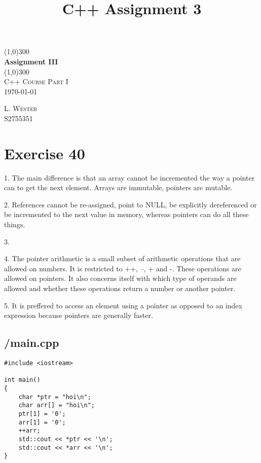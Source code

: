 \documentclass{article}
\title{C++ Assignment 3}
\begin{document}
\begin{titlepage}
    \begin{center}
        \line(1,0){300}\\
        [0.65cm]
        \huge{\bfseries Assignment III}\\
        \line(1,0){300}\\
        \textsc{\Large C++ Course Part I}\\
        \textsc{\LARGE \today}\\
        [5.5cm]     
    \end{center}
    \begin{flushright}
        \textsc{\Large L. Wester\\S2755351}\\
        [0.5cm]
    \end{flushright}
\end{titlepage}
\section*{Exercise 40}
1. The main difference is that an array cannot be incremented the way a pointer 
can to get the next element. Arrays are immutable, pointers are mutable.

2. References cannot be re-assigned, point to NULL, be explicitly dereferenced 
or be incremented to the next value in memory, whereas pointers can do all these
things.

3. 









4. The pointer arithmetic is a small subset of arithmetic operations that are allowed on numbers. It is restricted to ++, --, + and -. These operations are allowed on pointers. It also concerns itself with which type of operands are allowed and whether these operations return a number or another pointer.

5. It is preffered to access an element using a pointer as opposed to an index expression because pointers are generally faster.

\subsection*{/main.cpp}
\begin{verbatim}
#include <iostream>

int main()
{
    char *ptr = "hoi\n";
    char arr[] = "hoi\n";
    ptr[1] = '0';
    arr[1] = '0';
    ++arr;
    std::cout << *ptr << '\n';
    std::cout << *arr << '\n';
}
\end{verbatim}
\end{document}
